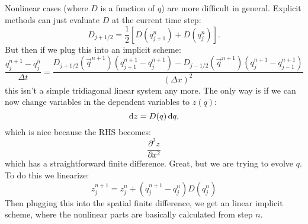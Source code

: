 Nonlinear cases (where $D$ is a function of $q$) are more
difficult in general. Explicit methods can just evaluate $D$ at the
current time step:
\begin{equation}
 D_{j+1/2} = \frac{1}{2}\left[D\left(q_{j+1}^n\right) +
 D\left(q_j^n\right)\right].
\end{equation}
But then if we plug this into an implicit scheme:
\begin{equation}
 \frac{q_j^{n+1} - q_j^n}{\Delta t}
  = \frac{D_{j+1/2}\left(\vec{q}^{n+1}\right) \left(q_{j+1}^{n+1} - q_{j}^{n+1}\right) -
  D_{j-1/2}\left(\vec{q}^{n+1}\right) \left(q_j^{n+1} - q_{j-1}^{n+1}\right)}{(\Delta x)^2}
\end{equation}
this isn't a simple tridiagonal linear system any more.  The only way
is if we can now change variables in the dependent variables to
$z(q)$:
\begin{equation}
{\rm d}z = D(q) \,{\rm d}q, 
\end{equation}
which is nice because the RHS becomes:
\begin{equation}
\frac{\partial^2 z}{\partial x^2}
\end{equation}
which has a straightforward finite difference.  Great, but we are
trying to evolve $q$. To do this we linearize:
\begin{equation}
 z_j^{n+1} = z_j^n + \left(q_j^{n+1} - q_j^{n}\right) D\left(q_j^n\right)
\end{equation}
Then plugging this into the spatial finite difference, we get an
linear implicit scheme, where the nonlinear parts are basically
calculated from step $n$.


